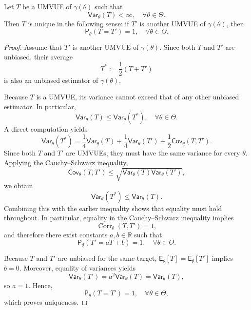\begin{pro}
\label{prop:UMVUE-unique}
Let \( T \) be a UMVUE of \( \gamma(\theta) \) such that
\[
\mathsf{Var}_{\theta}(T) < \infty, \quad \forall \theta \in \Theta.
\]
Then \( T \) is unique in the following sense: if \( T' \) is another UMVUE of
\( \gamma(\theta) \), then
\[
\mathsf{P}_{\theta}(T = T') = 1, \quad \forall \theta \in \Theta.
\]
\end{pro}

\begin{proof}
Assume that \( T' \) is another UMVUE of \( \gamma(\theta) \).
Since both \( T \) and \( T' \) are unbiased, their average
\[
T^{\ast} := \frac{1}{2}(T + T')
\]
is also an unbiased estimator of \( \gamma(\theta) \).

Because \( T \) is a UMVUE, its variance cannot exceed that of any other unbiased
estimator. In particular,
\[
\mathsf{Var}_{\theta}(T) \le \mathsf{Var}_{\theta}(T^{\ast}),
\quad \forall \theta \in \Theta.
\]
A direct computation yields
\[
\mathsf{Var}_{\theta}(T^{\ast})
= \frac{1}{4}\mathsf{Var}_{\theta}(T)
+ \frac{1}{4}\mathsf{Var}_{\theta}(T')
+ \frac{1}{2}\mathsf{Cov}_{\theta}(T, T').
\]
Since both \( T \) and \( T' \) are UMVUEs, they must have the same variance for
every \( \theta \). Applying the Cauchy--Schwarz inequality,
\[
\mathsf{Cov}_{\theta}(T, T')
\le \sqrt{\mathsf{Var}_{\theta}(T)\mathsf{Var}_{\theta}(T')},
\]
we obtain
\[
\mathsf{Var}_{\theta}(T^{\ast})
\le \mathsf{Var}_{\theta}(T).
\]
Combining this with the earlier inequality shows that equality must hold
throughout. In particular, equality in the Cauchy--Schwarz inequality implies
\[
\operatorname{Corr}_{\theta}(T, T') = 1,
\]
and therefore there exist constants \( a, b \in \mathbb{R} \) such that
\[
\mathsf{P}_{\theta}(T' = aT + b) = 1, \quad \forall \theta \in \Theta.
\]

Because \( T \) and \( T' \) are unbiased for the same target,
\( \mathsf{E}_{\theta}[T] = \mathsf{E}_{\theta}[T'] \) implies \( b = 0 \).
Moreover, equality of variances yields
\[
\mathsf{Var}_{\theta}(T')
= a^{2}\mathsf{Var}_{\theta}(T)
= \mathsf{Var}_{\theta}(T),
\]
so \( a = 1 \). Hence,
\[
\mathsf{P}_{\theta}(T = T') = 1, \quad \forall \theta \in \Theta,
\]
which proves uniqueness.
\end{proof}

